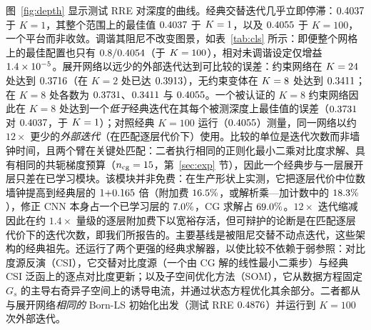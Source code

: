 \documentclass[UTF8,a4paper,11pt]{ctexart}
\newcommand{\numv}[1]{#1}
\begin{document}
图~\ref{fig:depth} 显示测试 RRE 对深度的曲线。经典交替迭代几乎立即停滞：$\numv{\NumClassOne}$ 于 $K=1$，其整个范围上的最佳值 $\numv{\NumClassBest}$ 于 $K=\numv{\NumClassBestK}$，以及 $\numv{\NumClassHundred}$ 于 $K=100$，一个平台而非收敛。调谐其阻尼不改变图景，如表~\ref{tab:cls} 所示：即便整个网格上的最佳配置也只有 $\numv{\NumClsSweepBest}$（于 $\numv{\NumClsSweepBestK}$），相对未调谐设定仅增益 $\numv{\NumClsSweepGain}$。展开网络以远少的外部迭代达到可比较的误差：约束网络在 $K=\numv{\NumConsBestK}$ 处达到 $\numv{\NumConsBest}$（在 $K=2$ 处已达 $\numv{\NumConsTwo}$），无约束变体在 $K=\numv{\NumUncBestK}$ 处达到 $\numv{\NumUncBest}$；在 $K=8$ 处各数为 $\numv{\NumConsEight}$、$\numv{\NumUncEight}$ 与 $\numv{\NumClassEight}$。一个被认证的 $K=8$ 约束网络因此在 $K=8$ 处达到一个\emph{低于}经典迭代在其每个被测深度上最佳值的误差（$\numv{\NumConsEight}$ 对 $\numv{\NumClassBest}$，于 $K=\numv{\NumClassBestK}$）；对照经典 $K=100$ 运行（$\numv{\NumClassHundred}$）测量，同一网络以约 $12\times$ 更少的\emph{外部迭代}（在匹配逐层代价下）使用。比较的单位是迭代次数而非墙钟时间，且两个臂在关键处匹配：二者执行相同的正则化最小二乘对比度求解、具有相同的共轭梯度预算（$n_{\mathrm{cg}}=\numv{\NumNCg}$，第~\ref{sec:exp} 节），因此一个经典步与一层展开层只差在已学习模块。该模块并非免费：在生产形状上实测，它把逐层代价中位数墙钟提高到经典层的 $1{+}\numv{\NumCostLayerOverhead}$ 倍（附加费 $\numv{\NumCostLayerOverheadPct}\%$，或解析乘—加计数中的 $\numv{\NumCostMacOverheadPct}\%$），修正 CNN 本身占一个已学习层的 $\numv{\NumCostCnnPct}\%$，CG 求解占 $\numv{\NumCostCgPct}\%$。$12\times$ 迭代缩减因此在约 $1.4\times$ 量级的逐层附加费下以宽裕存活，但可辩护的论断是在匹配逐层代价下的迭代次数，即我们所报告的。主要基线是被阻尼交替不动点迭代，这些架构的经典祖先。还运行了两个更强的经典求解器，以使比较不依赖于弱参照：对比度源反演（CSI）\cite{csi_lit}，它交替对比度源（一个由 CG 解的线性最小二乘步）与经典 CSI 泛函上的逐点对比度更新；以及子空间优化方法（SOM）\cite{som_lit}，它从数据方程固定 $G_s$ 的主导右奇异子空间上的诱导电流，并通过状态方程优化其余部分。二者都从与展开网络\emph{相同的} Born-LS 初始化出发（测试 RRE $\numv{\NumBornInitRre}$）并运行到 $K=100$ 次外部迭代。
\end{document}
